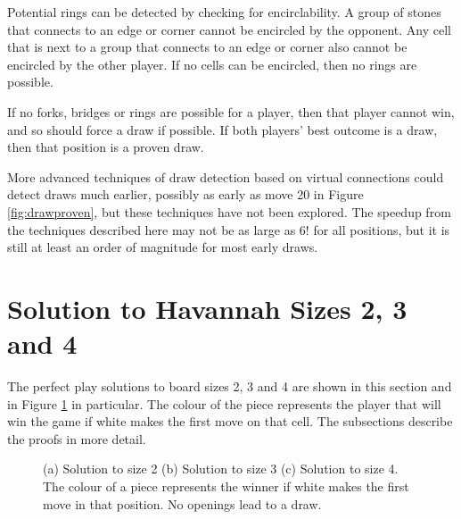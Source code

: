 Potential rings can be detected by checking for encirclability. A group of stones that connects to an edge or corner cannot be encircled by the opponent. Any cell that is next to a group that connects to an edge or corner also cannot be encircled by the other player. If no cells can be encircled, then no rings are possible.

If no forks, bridges or rings are possible for a player, then that player cannot win, and so should force a draw if possible. If both players' best outcome is a draw, then that position is a proven draw.

More advanced techniques of draw detection based on virtual connections could detect draws much earlier, possibly as early as move 20 in Figure \ref{fig:drawproven}, but these techniques have not been explored. The speedup from the techniques described here may not be as large as $6!$ for all positions, but it is still at least an order of magnitude for most early draws.


\section{Solution to Havannah Sizes 2, 3 and 4}

The perfect play solutions to board sizes 2, 3 and 4 are shown in this section and in Figure \ref{fig:solutionboard} in particular. The colour of the piece represents the player that will win the game if white makes the first move on that cell. The subsections describe the proofs in more detail.

\begin{figure}[tb]
\centering
\caption[Solution to Board Sizes 2, 3 and 4]{(a) Solution to size 2 (b) Solution to size 3 (c) Solution to size 4. The colour of a piece represents the winner if white makes the first move in that position. No openings lead to a draw.}
\label{fig:solutionboard}
\end{figure}


